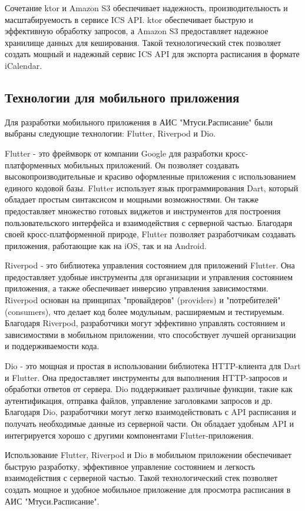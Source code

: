 Сочетание ktor и Amazon S3 обеспечивает надежность, производительность и масштабируемость в сервисе ICS API. 
ktor обеспечивает быструю и эффективную обработку запросов, а Amazon S3 предоставляет надежное хранилище данных для кеширования. 
Такой технологический стек позволяет создать мощный и надежный сервис ICS API для экспорта расписания в формате iCalendar.

\subsection{Технологии для мобильного приложения}

Для разработки мобильного приложения в АИС "Мтуси.Расписание" были выбраны следующие технологии: Flutter, Riverpod и Dio.

Flutter - это фреймворк от компании Google для разработки кросс-платформенных мобильных приложений. 
Он позволяет создавать высокопроизводительные и красиво оформленные приложения с использованием единого кодовой базы. 
Flutter использует язык программирования Dart, который обладает простым синтаксисом и мощными возможностями. 
Он также предоставляет множество готовых виджетов и инструментов для построения пользовательского интерфейса 
и взаимодействия с серверной частью. Благодаря своей кросс-платформенной природе, 
Flutter позволяет разработчикам создавать приложения, работающие как на iOS, так и на Android.

Riverpod - это библиотека управления состоянием для приложений Flutter. 
Она предоставляет удобные инструменты для организации и управления состоянием приложения, 
а также обеспечивает инверсию управления зависимостями. 
Riverpod основан на принципах "провайдеров" (providers) и "потребителей" (consumers), 
что делает код более модульным, расширяемым и тестируемым. Благодаря Riverpod, 
разработчики могут эффективно управлять состоянием и зависимостями в мобильном приложении, 
что способствует лучшей организации и поддерживаемости кода.

Dio - это мощная и простая в использовании библиотека HTTP-клиента для Dart и Flutter. 
Она предоставляет инструменты для выполнения HTTP-запросов и обработки ответов от сервера. 
Dio поддерживает различные функции, такие как аутентификация, отправка файлов, 
управление заголовками запросов и др. Благодаря Dio, разработчики могут легко взаимодействовать 
с API расписания и получать необходимые данные из серверной части. 
Он обладает удобным API и интегрируется хорошо с другими компонентами Flutter-приложения.

Использование Flutter, Riverpod и Dio в мобильном приложении обеспечивает быструю разработку, 
эффективное управление состоянием и легкость взаимодействия с серверной частью. 
Такой технологический стек позволяет создать мощное и удобное мобильное приложение для просмотра расписания в АИС "Мтуси.Расписание".